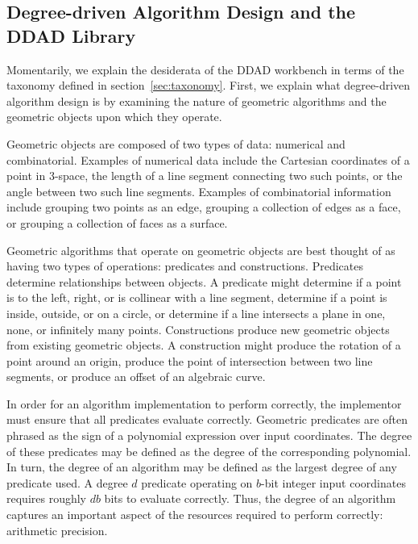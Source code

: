\subsection{Degree-driven Algorithm Design and the DDAD Library}

Momentarily, we explain the desiderata of the DDAD workbench in terms of the
taxonomy defined in section~\ref{sec:taxonomy}. First, we explain what
degree-driven algorithm design is by examining the nature of geometric
algorithms and the geometric objects upon which they operate.


Geometric objects are composed of two types of data: numerical and
combinatorial. Examples of numerical data include the Cartesian coordinates of a
point in 3-space, the length of a line segment connecting two such points, or
the angle between two such line segments. Examples of combinatorial information
include grouping two points as an edge, grouping a collection of edges as a
face, or grouping a collection of faces as a surface.

Geometric algorithms that operate on geometric objects are best thought of as
having two types of operations: predicates and constructions. Predicates
determine relationships between objects. A predicate might determine if a point
is to the left, right, or is collinear with a line segment, determine if a point
is inside, outside, or on a circle, or determine if a line intersects a plane in
one, none, or infinitely many points. Constructions produce new geometric
objects from existing geometric objects. A construction might produce the
rotation of a point around an origin, produce the point of intersection between
two line segments, or produce an offset of an algebraic curve.

In order for an algorithm implementation to perform correctly, the implementor
must ensure that all predicates evaluate correctly. Geometric predicates are
often phrased as the sign of a polynomial expression over input coordinates. The
degree of these predicates may be defined as the degree of the corresponding
polynomial. In turn, the degree of an algorithm may be defined as the largest
degree of any predicate used. A degree $d$ predicate operating on $b$-bit
integer input coordinates requires roughly $db$ bits to evaluate correctly.
Thus, the degree of an algorithm captures an important aspect of the resources
required to perform correctly: arithmetic precision.

